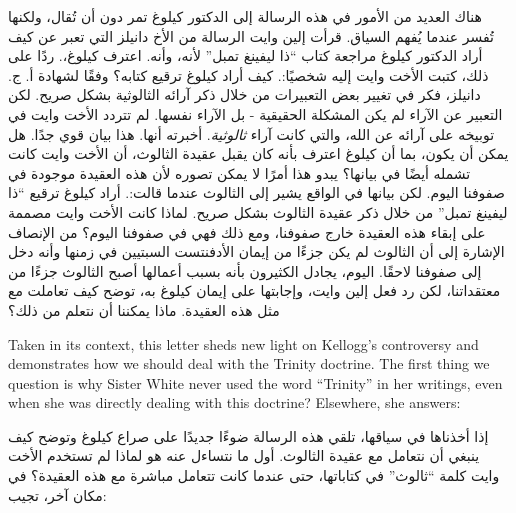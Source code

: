 هناك العديد من الأمور في هذه الرسالة إلى الدكتور كيلوغ تمر دون أن تُقال، ولكنها تُفسر عندما يُفهم السياق. قرأت إلين وايت الرسالة من الأخ دانيلز التي تعبر عن كيف أراد الدكتور كيلوغ مراجعة كتاب “ذا ليفينغ تمبل” لأنه، وأنه. اعترف كيلوغ،. ردًا على ذلك، كتبت الأخت وايت إليه شخصيًا:. كيف أراد كيلوغ ترقيع كتابه؟ وفقًا لشهادة أ. ج. دانيلز، فكر في تغيير بعض التعبيرات من خلال ذكر آرائه الثالوثية بشكل صريح. لكن التعبير عن الآراء لم يكن المشكلة الحقيقية - بل الآراء نفسها. لم تتردد الأخت وايت في توبيخه على آرائه عن الله، والتي كانت آراء \textit{ثالوثية}. أخبرته أنها. هذا بيان قوي جدًا. هل يمكن أن يكون، بما أن كيلوغ اعترف بأنه كان يقبل عقيدة الثالوث، أن الأخت وايت كانت تشمله أيضًا في بيانها؟ يبدو هذا أمرًا لا يمكن تصوره لأن هذه العقيدة موجودة في صفوفنا اليوم. لكن بيانها في الواقع يشير إلى الثالوث عندما قالت:. أراد كيلوغ ترقيع “ذا ليفينغ تمبل” من خلال ذكر عقيدة الثالوث بشكل صريح. لماذا كانت الأخت وايت مصممة على إبقاء هذه العقيدة خارج صفوفنا، ومع ذلك فهي في صفوفنا اليوم؟ من الإنصاف الإشارة إلى أن الثالوث لم يكن جزءًا من إيمان الأدفنتست السبتيين في زمنها وأنه دخل إلى صفوفنا لاحقًا. اليوم، يجادل الكثيرون بأنه بسبب أعمالها أصبح الثالوث جزءًا من معتقداتنا، لكن رد فعل إلين وايت، وإجابتها على إيمان كيلوغ به، توضح كيف تعاملت مع مثل هذه العقيدة. ماذا يمكننا أن نتعلم من ذلك؟


Taken in its context, this letter sheds new light on Kellogg’s controversy and demonstrates how we should deal with the Trinity doctrine. The first thing we question is why Sister White never used the word “Trinity” in her writings, even when she was directly dealing with this doctrine? Elsewhere, she answers:


إذا أخذناها في سياقها، تلقي هذه الرسالة ضوءًا جديدًا على صراع كيلوغ وتوضح كيف ينبغي أن نتعامل مع عقيدة الثالوث. أول ما نتساءل عنه هو لماذا لم تستخدم الأخت وايت كلمة “ثالوث” في كتاباتها، حتى عندما كانت تتعامل مباشرة مع هذه العقيدة؟ في مكان آخر، تجيب:


